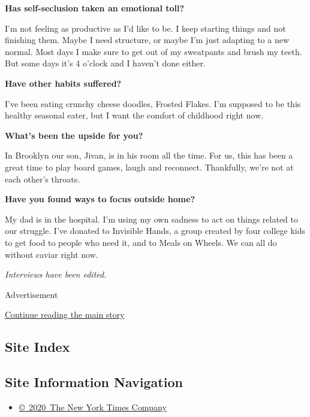 \textbf{Has self-seclusion taken an emotional toll?}

I'm not feeling as productive as I'd like to be. I keep starting things
and not finishing them. Maybe I need structure, or maybe I'm just
adapting to a new normal. Most days I make sure to get out of my
sweatpants and brush my teeth. But some days it's 4 o'clock and I
haven't done either.

\textbf{Have other habits suffered?}

I've been eating crunchy cheese doodles, Frosted Flakes. I'm supposed to
be this healthy seasonal eater, but I want the comfort of childhood
right now.

\textbf{What's been the upside for you?}

In Brooklyn our son, Jivan, is in his room all the time. For us, this
has been a great time to play board games, laugh and reconnect.
Thankfully, we're not at each other's throats.

\textbf{Have you found ways to focus outside home?}

My dad is in the hospital. I'm using my own sadness to act on things
related to our struggle. I've donated to Invisible Hands, a group
created by four college kids to get food to people who need it, and to
Meals on Wheels. We can all do without caviar right now.

\emph{Interviews have been edited.}

Advertisement

\protect\hyperlink{after-bottom}{Continue reading the main story}

\hypertarget{site-index}{%
\subsection{Site Index}\label{site-index}}

\hypertarget{site-information-navigation}{%
\subsection{Site Information
Navigation}\label{site-information-navigation}}

\begin{itemize}
\tightlist
\item
  \href{https://help.nytimes.com/hc/en-us/articles/115014792127-Copyright-notice}{©~2020~The
  New York Times Company}
\end{itemize}

